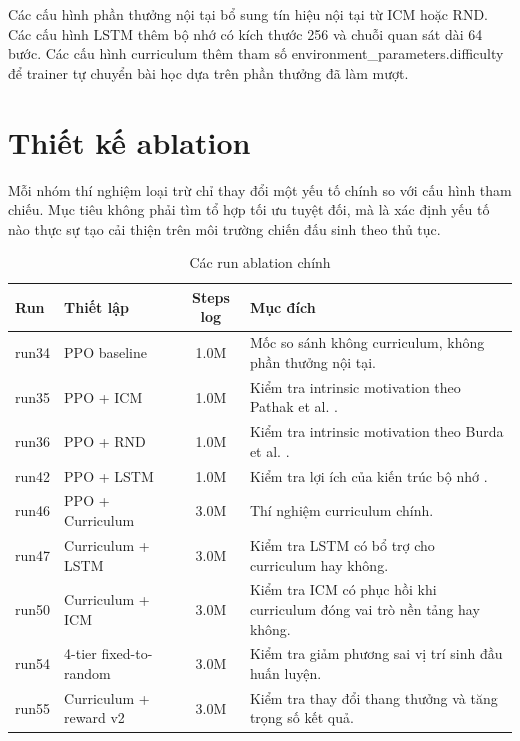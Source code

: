 Các cấu hình phần thưởng nội tại bổ sung tín hiệu nội tại từ ICM hoặc RND. Các cấu hình LSTM thêm bộ nhớ có kích thước 256 và chuỗi quan sát dài 64 bước. Các cấu hình curriculum thêm tham số environment\_parameters.difficulty để trainer tự chuyển bài học dựa trên phần thưởng đã làm mượt.

\section{Thiết kế ablation}

Mỗi nhóm thí nghiệm loại trừ chỉ thay đổi một yếu tố chính so với cấu hình tham chiếu. Mục tiêu không phải tìm tổ hợp tối ưu tuyệt đối, mà là xác định yếu tố nào thực sự tạo cải thiện trên môi trường chiến đấu sinh theo thủ tục.

\begin{table}[H]
    \centering
    \small
    \caption{Các run ablation chính}
    \label{tab:ablation_matrix_design}
    \begin{tabular}{|p{2cm}|p{5.1cm}|c|p{5.2cm}|}
        \hline
        \textbf{Run} & \textbf{Thiết lập} & \textbf{Steps log} & \textbf{Mục đích} \\
        \hline
        run34 & PPO baseline & 1.0M & Mốc so sánh không curriculum, không phần thưởng nội tại. \\
        \hline
        run35 & PPO + ICM & 1.0M & Kiểm tra intrinsic motivation theo Pathak et al. \cite{Pathak2017}. \\
        \hline
        run36 & PPO + RND & 1.0M & Kiểm tra intrinsic motivation theo Burda et al. \cite{Burda2018}. \\
        \hline
        run42 & PPO + LSTM & 1.0M & Kiểm tra lợi ích của kiến trúc bộ nhớ \cite{Hochreiter1997}. \\
        \hline
        run46 & PPO + Curriculum & 3.0M & Thí nghiệm curriculum chính. \\
        \hline
        run47 & Curriculum + LSTM & 3.0M & Kiểm tra LSTM có bổ trợ cho curriculum hay không. \\
        \hline
        run50 & Curriculum + ICM & 3.0M & Kiểm tra ICM có phục hồi khi curriculum đóng vai trò nền tảng hay không. \\
        \hline
        run54 & 4-tier fixed-to-random & 3.0M & Kiểm tra giảm phương sai vị trí sinh đầu huấn luyện. \\
        \hline
        run55 & Curriculum + reward v2 & 3.0M & Kiểm tra thay đổi thang thưởng và tăng trọng số kết quả. \\
        \hline
    \end{tabular}
\end{table}

